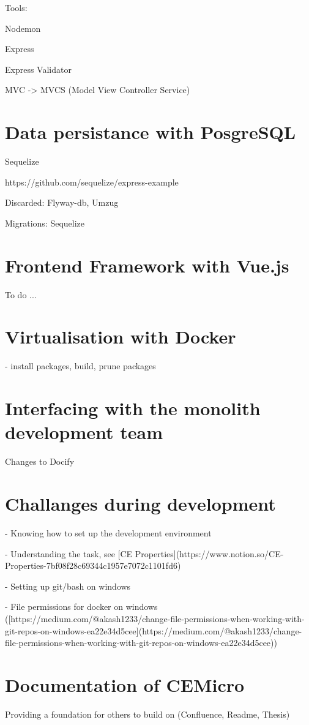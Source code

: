 Tools:

Nodemon

Express

Express Validator

MVC -> MVCS (Model View Controller Service)


\section{Data persistance with PosgreSQL}

Sequelize

https://github.com/sequelize/express-example

Discarded: Flyway-db, Umzug

Migrations: Sequelize


\section{Frontend Framework with Vue.js}

To do ...


\section{Virtualisation with Docker}

- install packages, build, prune packages


\section{Interfacing with the monolith development team}

Changes to Docify


\section{Challanges during development}

- Knowing how to set up the development environment

- Understanding the task, see [CE Properties](https://www.notion.so/CE-Properties-7bf08f28c69344c1957e7072c1101fd6)

- Setting up git/bash on windows

- File permissions for docker on windows ([https://medium.com/@akash1233/change-file-permissions-when-working-with-git-repos-on-windows-ea22e34d5cee](https://medium.com/@akash1233/change-file-permissions-when-working-with-git-repos-on-windows-ea22e34d5cee))


\section{Documentation of CEMicro}

Providing a foundation for others to build on (Confluence, Readme, Thesis)
